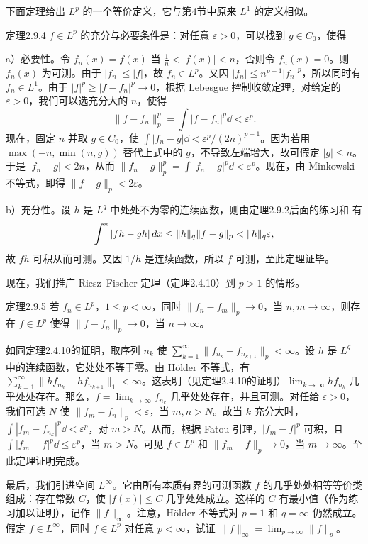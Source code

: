 下面定理给出 $L^p$ 的一个等价定义，它与第4节中原来 $L^1$ 的定义相似。
\begin{statement}{定理}{2.9.4}
$f\in L^p$ 的充分与必要条件是：对任意 $\varepsilon>0$，可以找到 $g\in C_0$，使得
\end{statement}
\Proof a）必要性。令 $f_n(x)=f(x)$ 当 $\frac1n<|f(x)|<n$，否则令 $f_n(x)=0$。则 $f_n(x)$ 为可测。由于 $|f_n|\le|f|$，故 $f_n\in L^p$。又因 $|f_n|\le n^{p-1}|f_n|^p$，所以同时有 $f_n\in L^1$。由于 $|f|^p\ge|f-f_n|^p\to0$，根据 Lebesgue 控制收敛定理，对给定的 $\varepsilon>0$，我们可以选充分大的 $n$，使得
\[\|f-f_n\|_p^p=\int|f-f_n|^p\dd<\varepsilon^p.\]
现在，固定 $n$ 并取 $g\in C_0$，使 $\int|f_n-g|\dd<\varepsilon^p/(2n)^{p-1}$。因为若用 $\max(-n,\min(n,g))$ 替代上式中的 $g$，不导致左端增大，故可假定 $|g|\le n$。于是 $|f_n-g|<2n$，从而 $\|f_n-g\|_p^p=\int|f_n-g|^p\dd<\varepsilon^p$。现在，由 Minkowski 不等式，即得 $\|f-g\|_p<2\varepsilon$。

b）充分性。设 $h$ 是 $L^q$ 中处处不为零的连续函数，则由定理2.9.2后面的练习和  有
\[\int^{*}|fh-gh|\,dx\le\|h\|_q\|f-g\|_p<\|h\|_q\varepsilon,\]
故 $fh$ 可积从而可测。又因 $1/h$ 是连续函数，所以 $f$ 可测，至此定理证毕。

现在，我们推广 Riesz--Fischer 定理（定理2.4.10）到 $p>1$ 的情形。
\begin{statement}{定理}{2.9.5}
若 $f_n\in L^p$，$1\le p<\infty$，同时 $\|f_n-f_m\|_p\to0$，当 $n,m\to\infty$，则存在 $f\in L^p$ 使得 $\|f-f_n\|_p\to0$，当 $n\to\infty$。
\end{statement}
\Proof 如同定理2.4.10的证明，取序列 $n_k$ 使 $\sum_{k=1}^\infty\|f_{n_k}-f_{n_{k+1}}\|_p<\infty$。设 $h$ 是 $L^q$ 中的连续函数，它处处不等于零。由 Hölder 不等式，有 $\sum_{k=1}^\infty\|hf_{n_k}-hf_{n_{k+1}}\|_1<\infty$。这表明（见定理2.4.10的证明）$\lim_{k\to\infty}hf_{n_k}$ 几乎处处存在。那么，$f=\lim_{k\to\infty}f_{n_k}$ 几乎处处存在，并且可测。对任给 $\varepsilon>0$，我们可选 $N$ 使 $\|f_m-f_n\|_p<\varepsilon$，当 $m,n>N$。故当 $k$ 充分大时，$\int|f_m-f_{n_k}|^p\dd<\varepsilon^p$，对 $m>N$。从而，根据 Fatou 引理，$|f_m-f|^p$ 可积，且 $\int|f_m-f|^p\dd\le\varepsilon^p$，当 $m>N$。可见 $f\in L^p$ 和 $\|f_m-f\|_p\to0$，当 $m\to\infty$。至此定理证明完成。

最后，我们引进空间 $L^\infty$。它由所有本质有界的可测函数 $f$ 的几乎处处相等等价类组成：存在常数 $C$，使 $|f(x)|\le C$ 几乎处处成立。这样的 $C$ 有最小值（作为练习加以证明），记作 $\|f\|_\infty$。注意，Hölder 不等式对 $p=1$ 和 $q=\infty$ 仍然成立。
\Exercise 假定 $f\in L^\infty$，同时 $f\in L^p$ 对任意 $p<\infty$，试证
$\|f\|_\infty=\lim_{p\to\infty}\|f\|_p$。
